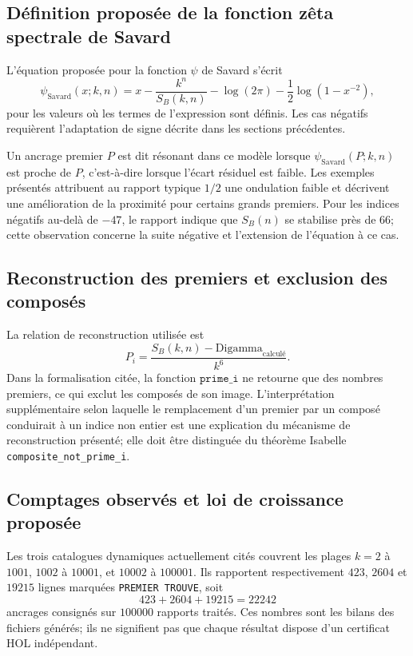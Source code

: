 \documentclass[11pt,a4paper]{article}
\begin{document}
\subsection{Définition proposée de la fonction zêta spectrale de Savard}

L'équation proposée pour la fonction $\psi$ de Savard s'écrit
\[
\psi_{\mathrm{Savard}}(x;k,n)
=x-\frac{k^n}{S_B(k,n)}
-\log(2\pi)-\frac{1}{2}\log(1-x^{-2}),
\]
pour les valeurs où les termes de l'expression sont définis. Les cas négatifs
requièrent l'adaptation de signe décrite dans les sections précédentes.

Un ancrage premier $P$ est dit résonant dans ce modèle lorsque
$\psi_{\mathrm{Savard}}(P;k,n)$ est proche de $P$, c'est-à-dire lorsque
l'écart résiduel est faible. Les exemples présentés attribuent au rapport
typique $1/2$ une ondulation faible et décrivent une amélioration de la
proximité pour certains grands premiers. Pour les indices négatifs au-delà de
$-47$, le rapport indique que $S_B(n)$ se stabilise près de $66$; cette
observation concerne la suite négative et l'extension de l'équation à ce cas.

\subsection{Reconstruction des premiers et exclusion des composés}

La relation de reconstruction utilisée est
\[
P_i=\frac{S_B(k,n)-\mathrm{Digamma}_{\mathrm{calculé}}}{k^6}.
\]
Dans la formalisation citée, la fonction $\texttt{prime\_i}$ ne retourne que
des nombres premiers, ce qui exclut les composés de son image. L'interprétation
supplémentaire selon laquelle le remplacement d'un premier par un composé
conduirait à un indice non entier est une explication du mécanisme de
reconstruction présenté; elle doit être distinguée du théorème Isabelle
\texttt{composite\_not\_prime\_i}.

\subsection{Comptages observés et loi de croissance proposée}

Les trois catalogues dynamiques actuellement cités couvrent les plages
$k=2$ à $1001$, $1002$ à $10001$, et $10002$ à $100001$. Ils rapportent
respectivement $423$, $2604$ et $19215$ lignes marquées
\texttt{PREMIER TROUVE}, soit
\[
423+2604+19215=22242
\]
ancrages consignés sur $100000$ rapports traités. Ces nombres sont les bilans
des fichiers générés; ils ne signifient pas que chaque résultat dispose d'un
certificat HOL indépendant.
\end{document}
